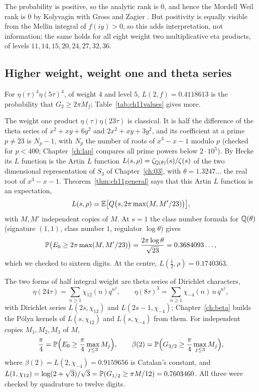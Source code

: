 The probability is positive, so the analytic rank is $0$, and hence the Mordell Weil rank is $0$ by Kolyvagin \cite{kolyvagin1988} with Gross and Zagier \cite{grosszagier1986}. But positivity is equally visible from the Mellin integral of $f(iy)>0$, so this adds interpretation, not information; the same holds for all eight weight two multiplicative eta products, of levels $11,14,15,20,24,27,32,36$.

\subsection{Higher weight, weight one and theta series}

For $\eta(\tau)^4\eta(5\tau)^4$, of weight $4$ and level $5$, $L(2,f)=0.4118613$ is the probability that $G_2\ge2\pi M_f$; Table~\ref{tab:ch11values} gives more.

The weight one product $\eta(\tau)\eta(23\tau)$ is classical. It is half the difference of the theta series of $x^2+xy+6y^2$ and $2x^2+xy+3y^2$, and its coefficient at a prime $p\ne23$ is $N_p-1$, with $N_p$ the number of roots of $x^3-x-1$ modulo $p$ (checked for $p<400$; Chapter~\ref{ch:lap} compares all prime powers below $2\cdot10^5$). By Hecke \cite{hecke1937} its $L$ function is the Artin $L$ function $L(s,\rho)=\zeta_{\mathbb{Q}(\theta)}(s)/\zeta(s)$ of the two dimensional representation of $S_3$ of Chapter~\ref{ch:03}, with $\theta=1.3247\ldots$ the real root of $x^3-x-1$. Theorem~\ref{thm:ch11general} says that this Artin $L$ function is an expectation,
\[
L(s,\rho)=\mathbb{E}\bigl[Q\bigl(s,2\pi\max(M,M'/23)\bigr)\bigr],
\]
with $M,M'$ independent copies of $M$. At $s=1$ the class number formula for $\mathbb{Q}(\theta)$ (signature $(1,1)$, class number $1$, regulator $\log\theta$) gives
\[
\mathbb{P}\bigl(E_0\ge2\pi\max(M,M'/23)\bigr)=\frac{2\pi\log\theta}{\sqrt{23}}=0.3684093\ldots,
\]
which we checked to sixteen digits. At the centre, $L(\frac12,\rho)=0.1740363$.

The two forms of half integral weight are theta series of Dirichlet characters,
\[
\eta(24\tau)=\sum_{n\ge1}\chi_{12}(n)q^{n^2},\qquad\eta(8\tau)^3=\sum_{n\ge1}\chi_{-4}(n)\,n\,q^{n^2},
\]
with Dirichlet series $L(2s,\chi_{12})$ and $L(2s-1,\chi_{-4})$; Chapter~\ref{ch:beta} builds the P\'olya kernels of $L(s,\chi_{12})$ and $L(s,\chi_{-4})$ from them. For independent copies $M_1,M_2,M_3$ of $M$,
\[
\frac\pi4=\mathbb{P}\Bigl(E_0\ge\frac\pi4\max_{j\le3}M_j\Bigr),\qquad \beta(2)=\mathbb{P}\Bigl(G_{3/2}\ge\frac\pi4\max_{j\le3}M_j\Bigr),
\]
where $\beta(2)=L(2,\chi_{-4})=0.9159656$ is Catalan's constant, and $L(1,\chi_{12})=\log(2+\sqrt3)/\sqrt3=\mathbb{P}(G_{1/2}\ge\pi M/12)=0.7603460$. All three were checked by quadrature to twelve digits.

